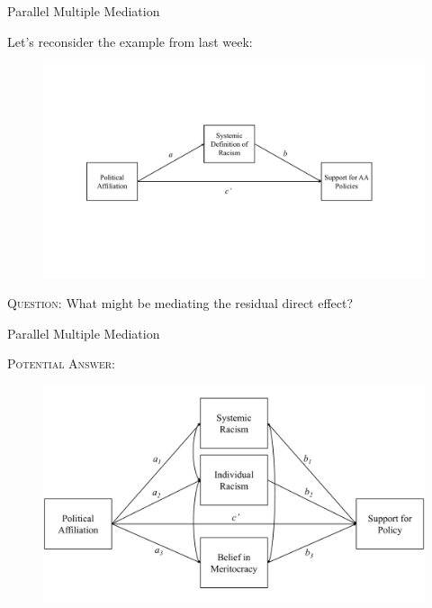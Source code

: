 \documentclass{beamer}
\newcommand{\vx}[1]{\vspace{#1pt}}
\begin{document}
\begin{frame}{Parallel Multiple Mediation}
  
  Let's reconsider the example from last week:
  
  \vx{-12}
  
  \begin{figure}
    \includegraphics[width=\textwidth]{figures/adamsKlpsExample1PathDiagram.pdf}
  \end{figure}

  \vx{-24}
  
  \textsc{Question:} What might be mediating the residual direct effect?
  
\end{frame}


\begin{frame}{Parallel Multiple Mediation}

  \textsc{Potential Answer:}
  
  \begin{figure}
    \includegraphics[width=\textwidth]{figures/adamsKlpsParallel.pdf}
  \end{figure}

\end{frame}
\end{document}
